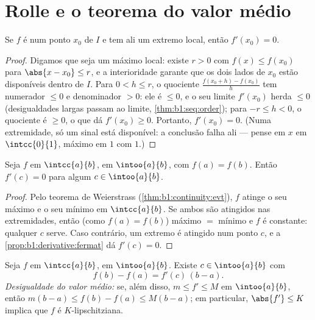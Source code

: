 \section{Rolle e o teorema do valor médio}

\begin{proposition}\label{prop:b1:derivative:fermat}
Se $f$ é  num ponto \emph{} $x_0$ de $I$ e
tem ali um extremo local, então $f'(x_0) = 0$.
\end{proposition}

\begin{proof}
Digamos que seja um máximo local: existe $r > 0$ com $f(x) \leq f(x_0)$
para $\abs{x - x_0} \leq r$, e a interioridade garante que os dois
lados de $x_0$ estão disponíveis dentro de $I$. Para $0 < h \leq r$, o
quociente $\frac{f(x_0 + h) - f(x_0)}{h}$ tem numerador $\leq 0$
e denominador $> 0$: ele é $\leq 0$, e o seu limite $f'(x_0)$
herda $\leq 0$ (desigualdades largas passam ao limite,
\cref{thm:b1:seq:order}); para $-r \leq h < 0$, o quociente é
$\geq 0$, o que dá $f'(x_0) \geq 0$. Portanto, $f'(x_0) = 0$. (Numa
extremidade, só um sinal está disponível: a conclusão falha ali ---
pense em $x$ em $\intcc{0}{1}$, máximo em $1$ com 
$1$.)
\end{proof}

\begin{theorem}[Rolle]\label{thm:b1:derivative:rolle}
Seja $f$  em $\intcc{a}{b}$,  em
$\intoo{a}{b}$, com $f(a) = f(b)$. Então $f'(c) = 0$ para algum $c \in
\intoo{a}{b}$.
\end{theorem}

\begin{proof}
Pelo teorema de Weierstrass (\cref{thm:b1:continuity:evt}), $f$
atinge o seu máximo e o seu mínimo em $\intcc{a}{b}$. Se ambos são
atingidos nas extremidades, então (como $f(a) = f(b)$) máximo $=$ mínimo e $f$
é constante: qualquer $c$  serve. Caso contrário, um extremo é
atingido num ponto  $c$, e a
\cref{prop:b1:derivative:fermat} dá $f'(c) = 0$.
\end{proof}

\begin{theorem}\label{thm:b1:derivative:mvt}
Seja $f$  em $\intcc{a}{b}$,  em
$\intoo{a}{b}$. Existe $c \in \intoo{a}{b}$ com
\[
f(b) - f(a) = f'(c)\,(b - a) .
\]
\emph{Desigualdade do valor médio:} se, além disso, $m \leq f' \leq M$ em
$\intoo{a}{b}$, então $m(b-a) \leq f(b) - f(a) \leq M(b-a)$; em
particular, $\abs{f'} \leq K$ implica que $f$ é $K$-lipschitziana.
\end{theorem}

